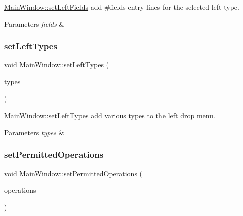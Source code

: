\hyperlink{class_main_window_a48d094bc4e7965be372f62d2f6e6d910}{Main\+Window\+::set\+Left\+Fields} add \#fields entry lines for the selected left type. 


\begin{DoxyParams}{Parameters}
{\em fields} & \\
\hline
\end{DoxyParams}
\mbox{\label{class_main_window_ae065551040ada6411fc1fb4f3887dd3b}} 
\subsubsection{\texorpdfstring{set\+Left\+Types}{setLeftTypes}}
{\footnotesize\ttfamily void Main\+Window\+::set\+Left\+Types (\begin{DoxyParamCaption}\item[{const Q\+Vector$<$ Q\+String $>$}]{types }\end{DoxyParamCaption})\hspace{0.3cm}{\ttfamily [slot]}}



\hyperlink{class_main_window_ae065551040ada6411fc1fb4f3887dd3b}{Main\+Window\+::set\+Left\+Types} add various types to the left drop menu. 


\begin{DoxyParams}{Parameters}
{\em types} & \\
\hline
\end{DoxyParams}
\mbox{\label{class_main_window_a86f711960ec362153b5d2ef6667c6c0c}} 
\subsubsection{\texorpdfstring{set\+Permitted\+Operations}{setPermittedOperations}}
{\footnotesize\ttfamily void Main\+Window\+::set\+Permitted\+Operations (\begin{DoxyParamCaption}\item[{const Q\+Vector$<$ Q\+String $>$}]{operations }\end{DoxyParamCaption})\hspace{0.3cm}{\ttfamily [slot]}}



